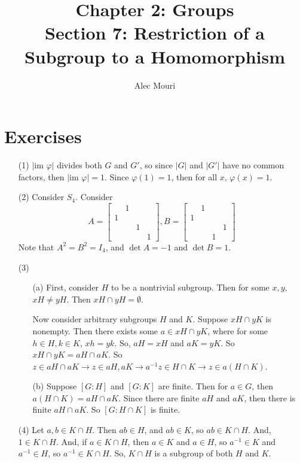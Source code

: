 \documentclass[12pt]{article}
\begin{document}
\title{Chapter 2: Groups \\ Section 7: Restriction of a Subgroup to a Homomorphism}
\author{Alec Mouri}

\maketitle
\section*{Exercises}
\begin{itemize}
\item[(1)]
$|\text{im }\varphi|$ divides both $G$ and $G'$, so since $|G|$ and $|G'|$ have no common factors, then $|\text{im }\varphi| = 1$. Since $\varphi(1) = 1$, then for all $x$, $\varphi(x) = 1$.
\item[(2)] Consider $S_4$. Consider
$$A = \begin{bmatrix}
& 1 \\
1 \\
& & 1 \\
& & & 1
\end{bmatrix}, B = \begin{bmatrix}
& 1 \\
1 \\
& & & 1 \\
& & 1
\end{bmatrix}$$
Note that $A^2 = B^2 = I_4$, and $\det A = -1$ and $\det B = 1$.
\item[(3)]
\begin{itemize}
\item[(a)]
First, consider $H$ to be a nontrivial subgroup. Then for some $x, y$, $xH \neq yH$. Then $xH \cap yH = \emptyset$.

Now consider arbitrary subgroups $H$ and $K$. Suppose $xH \cap yK$ is nonempty. Then there exists some $a \in xH \cap yK$, where for some $h \in H, k \in K$, $xh = yk$. So, $aH = xH$ and $aK = yK$. So $xH \cap yK = aH \cap aK$. So $z \in aH \cap aK \rightarrow z \in aH, aK \rightarrow a^{-1}z \in H \cap K \rightarrow z \in a(H \cap K)$.
\item[(b)]
Suppose $[G:H]$ and $[G:K]$ are finite. Then for $a \in G$, then $a(H \cap K) = aH \cap aK$. Since there are finite $aH$ and $aK$, then there is finite $aH \cap aK$. So $[G:H\cap K]$ is finite.
\end{itemize}
\item[(4)]
Let $a, b \in K \cap H$. Then $ab \in H$, and $ab \in K$, so $ab \in K \cap H$. And, $1 \in K \cap H$. And, if $a \in K \cap H$, then $a \in K$ and $a \in H$, so $a^{-1} \in K$ and $a^{-1} \in H$, so $a^{-1} \in K \cap H$. So, $K \cap H$ is a subgroup of both $H$ and $K$.


\end{itemize}
\end{document}
